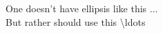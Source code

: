 \documentclass{article}
\begin{document}
One doesn't have ellipsis like this ...\\
But rather should use this \textbackslash ldots
\end{document}
